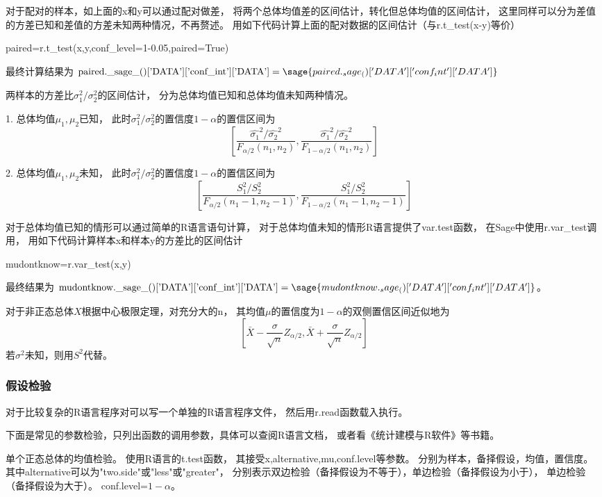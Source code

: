 对于配对的样本，如上面的x和y可以通过配对做差，
将两个总体均值差的区间估计，转化但总体均值的区间估计，
这里同样可以分为差值的方差已知和差值的方差未知两种情况，不再赘述。
用如下代码计算上面的配对数据的区间估计（与r.t\_test(x-y)等价）
\begin{sageblock}
paired=r.t_test(x,y,conf_level=1-0.05,paired=True)
\end{sageblock}
最终计算结果为
$\textrm{paired.\_sage\_()['DATA']['conf\_int']['DATA']}=
\sage{paired._sage_()['DATA']['conf_int']['DATA']}$

两样本的方差比$\sigma_1^2/\sigma_2^2$的区间估计，
分为总体均值已知和总体均值未知两种情况。

1. 总体均值$\mu_1,\mu_2$已知，
此时$\sigma_1^2/\sigma_2^2$的置信度$1-\alpha$的置信区间为
\[\left[ \frac{\hat{\sigma_1}^2/\hat{\sigma_2}^2}{F_{\alpha/2}(n_1,n_2)},
\frac{\hat{\sigma_1}^2/\hat{\sigma_2}^2}{F_{1-\alpha/2}(n_1,n_2)} \right]\]

2. 总体均值$\mu_1,\mu_2$未知，
此时$\sigma_1^2/\sigma_2^2$的置信度$1-\alpha$的置信区间为
\[\left[\frac{S_1^2/S_2^2}{F_{\alpha/2}(n_1-1,n_2-1)},
\frac{S_1^2/S_2^2}{F_{1-\alpha/2}(n_1-1,n_2-1)}\right]\]

对于总体均值已知的情形可以通过简单的R语言语句计算，
对于总体均值未知的情形R语言提供了var.test函数，
在Sage中使用r.var\_test调用，
用如下代码计算样本x和样本y的方差比的区间估计
\begin{sageblock}
mudontknow=r.var_test(x,y)
\end{sageblock}
最终结果为
$\textrm{mudontknow.\_sage\_()['DATA']['conf\_int']['DATA']}=
\sage{mudontknow._sage_()['DATA']['conf_int']['DATA']}$。

对于非正态总体$X$根据中心极限定理，对充分大的n，
其均值$\mu$的置信度为$1-\alpha$的双侧置信区间近似地为
\[\left[ \bar{X}-\frac{\sigma}{\sqrt{n}}Z_{\alpha/2},\bar{X}+\frac{\sigma}{\sqrt{n}}Z_{\alpha/2} \right]\]
若$\sigma^2$未知，则用$S^2$代替。

\subsubsection{假设检验}
对于比较复杂的R语言程序对可以写一个单独的R语言程序文件，
然后用r.read函数载入执行。

下面是常见的参数检验，只列出函数的调用参数，具体可以查阅R语言文档，
或者看《统计建模与R软件》等书籍。

单个正态总体的均值检验。\newline
使用R语言的t.test函数，
其接受x,alternative,mu,conf.level等参数。
分别为样本，备择假设，均值，置信度。
其中alternative可以为"two.side"或"less"或"greater"，
分别表示双边检验（备择假设为不等于），单边检验（备择假设为小于），
单边检验（备择假设为大于）。
conf.level=$1-\alpha$。


